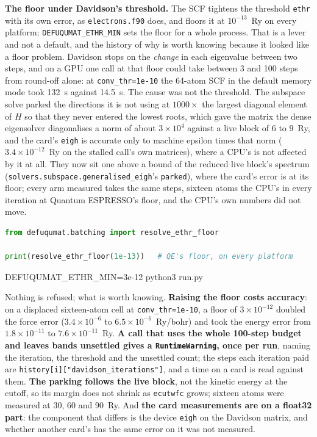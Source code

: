 \documentclass[11pt,a4paper]{article}
\newcommand{\qe}{Quantum ESPRESSO}
\newcommand{\code}[1]{\texttt{\small #1}}
\begin{document}
\textbf{The floor under Davidson's threshold.} The SCF tightens the threshold
\code{ethr} with its own error, as \code{electrons.f90} does, and floors it at
$10^{-13}$~Ry on every platform; \code{DEFUQUMAT\_ETHR\_MIN} sets the floor for a
whole process. That is a lever and not a default, and the history of why is worth
knowing because it looked like a floor problem. Davidson stops on the \emph{change}
in each eigenvalue between two steps, and on a GPU one call at that floor could
take between 3 and 100 steps from round-off alone: at \code{conv\_thr=1e-10} the
64-atom SCF in the default memory mode took 132~s against 14.5~s. The cause was
not the threshold. The subspace solve parked the directions it is not using at
$1000\times$ the largest diagonal element of $H$ so that they never entered the
lowest roots, which gave the matrix the dense eigensolver diagonalises a norm of
about $3\times10^4$ against a live block of 6 to 9~Ry, and the card's \code{eigh}
is accurate only to machine epsilon times that norm ($3.4\times10^{-12}$~Ry on the
stalled call's own matrices), where a CPU's is not affected by it at all. They now
sit one above a bound of the reduced live block's spectrum
(\code{solvers.subspace.generalised\_eigh}'s \code{parked}), where the card's error
is at its floor; every arm measured takes the same steps, sixteen atoms the CPU's
in every iteration at \qe's floor, and the CPU's own numbers did not move.

\begin{lstlisting}[language=Python]
from defuqumat.batching import resolve_ethr_floor

print(resolve_ethr_floor(1e-13))   # QE's floor, on every platform
\end{lstlisting}

\begin{shcode}
DEFUQUMAT_ETHR_MIN=3e-12 python3 run.py
\end{shcode}

\begin{refuses}
Nothing is refused; what is worth knowing. \textbf{Raising the floor costs accuracy}:
on a displaced sixteen-atom cell at \code{conv\_thr=1e-10}, a floor of $3\times10^{-12}$
doubled the force error ($3.4\times10^{-6}$ to $6.5\times10^{-6}$~Ry/bohr) and took the
energy error from $1.8\times10^{-11}$ to $7.6\times10^{-11}$~Ry. \textbf{A call that
uses the whole 100-step budget and leaves bands unsettled gives a
\code{RuntimeWarning}, once per run}, naming the iteration, the threshold and the
unsettled count; the steps each iteration paid are
\code{history[i]["davidson\_iterations"]}, and a time on a card is read against them.
\textbf{The parking follows the live block}, not the kinetic energy at the
cutoff, so its margin does not shrink as \code{ecutwfc} grows; sixteen atoms were
measured at 30, 60 and 90~Ry. And \textbf{the
card measurements are on a float32 part}: the component that differs is the device
\code{eigh} on the Davidson matrix, and whether another card's has the same error
on it was not measured.
\end{refuses}
\end{document}
